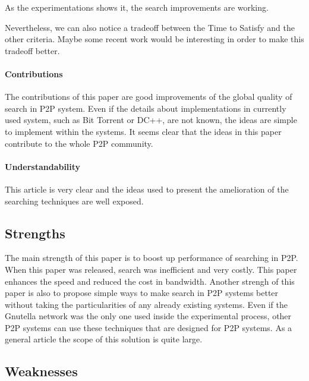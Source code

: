 As the experimentations shows it, the search improvements are working.

Nevertheless, we can also notice a tradeoff between the Time to Satisfy
and the other criteria. Maybe some recent work would be interesting
in order to make this tradeoff better.

\paragraph{Contributions}

The contributions of this paper are good improvements of the global quality
of search in P2P system. Even if the details about implementations in
currently used system, such as Bit Torrent or DC++, are not known, the ideas
are simple to implement within the systems. It seems clear that the ideas
in this paper contribute to the whole P2P community.

\paragraph{Understandability}

This article is very clear and the ideas used to present the
amelioration of the searching techniques are well exposed.

\subsection{Strengths}


The main strength of this paper is to boost up performance
of searching in P2P. When this paper was released, search
was inefficient and very costly. This paper enhances the speed
and reduced the cost in bandwidth. Another strengh of this paper
is also to propose simple ways to make search in P2P systems better
without taking the particularities of any already existing systems.
Even if the Gnutella network was the only one used inside the experimental
process, other P2P systems can use these techniques that are designed for
P2P systems. As a general article the scope of this solution is quite
large.

\subsection{Weaknesses}


